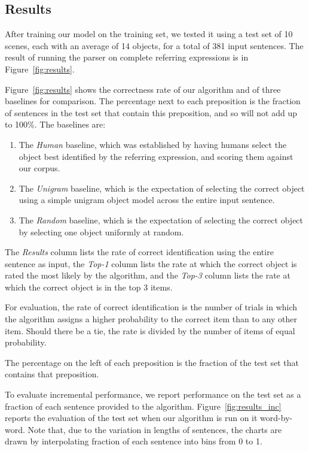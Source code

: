 \documentclass[conference]{IEEEtran}
\numberwithin{equation}{section}
\begin{document}
\subsection{Results}

After training our model on the training set, we tested it using a test set of 10 scenes, each with an average of 14 objects, for a total of 381 input sentences. The result of running the parser on complete referring expressions is in Figure~\ref{fig:results}.

Figure~\ref{fig:results} shows the correctness rate of our algorithm and of three baselines for comparison. The percentage next to each preposition is the fraction of sentences in the test set that contain this preposition, and so will not add up to 100\%. The baselines are:
\begin{enumerate}[topsep=0pt,itemsep=-1ex,partopsep=1ex,parsep=1ex]
	\item The \emph{Human} baseline, which was established by having humans select the object best identified by the referring expression, and scoring them against our corpus.
	\item The \emph{Unigram} baseline, which is the expectation of selecting the correct object using a simple unigram object model across the entire input sentence.
	\item The \emph{Random} baseline, which is the expectation of selecting the correct object by selecting one object uniformly at random.
\end{enumerate}

The \emph{Results} column lists the rate of correct identification using the entire sentence as input, the \emph{Top-1} column lists the rate at which the correct object is rated the most likely by the algorithm, and the \emph{Top-3} column lists the rate at which the correct object is in the top 3 items.

For evaluation, the rate of correct identification is the number of trials in which the algorithm assigns a higher probability to the correct item than to any other item. Should there be a tie, the rate is divided by the number of items of equal probability.

The percentage on the left of each preposition is the fraction of the test set that contains that preposition.

To evaluate incremental performance, we report performance on the test set as a fraction of each sentence provided to the algorithm. Figure~\ref{fig:results_inc} reports the evaluation of the test set when our algorithm is run on it word-by-word. Note that, due to the variation in lengths of sentences, the charts are drawn by interpolating fraction of each sentence into bins from 0 to 1.
\end{document}
